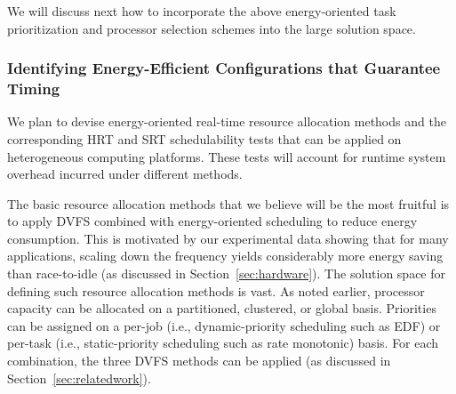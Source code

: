 We will discuss next how to incorporate the above energy-oriented task prioritization and processor selection schemes into the large solution space.

\subsubsection{Identifying Energy-Efficient Configurations that Guarantee Timing}
\label{sec:step1Config}

We plan to devise energy-oriented real-time resource allocation methods and the corresponding HRT and SRT schedulability tests that can be applied on heterogeneous computing platforms. These tests will account for runtime system overhead incurred under different methods.

The basic resource allocation methods that we believe will be the most fruitful is to apply DVFS combined with energy-oriented scheduling to reduce energy consumption. This is motivated by our experimental data showing that for many applications, scaling down the frequency yields considerably more energy saving than race-to-idle (as discussed in Section~\ref{sec:hardware}). The solution space for defining such resource allocation methods is vast. As noted earlier, processor capacity can be allocated on a partitioned, clustered, or global basis. Priorities can be assigned on a per-job (i.e., dynamic-priority scheduling such as EDF) or per-task (i.e., static-priority scheduling such as rate monotonic) basis. For each combination, the three DVFS methods can be applied (as discussed in Section~\ref{sec:relatedwork}).

